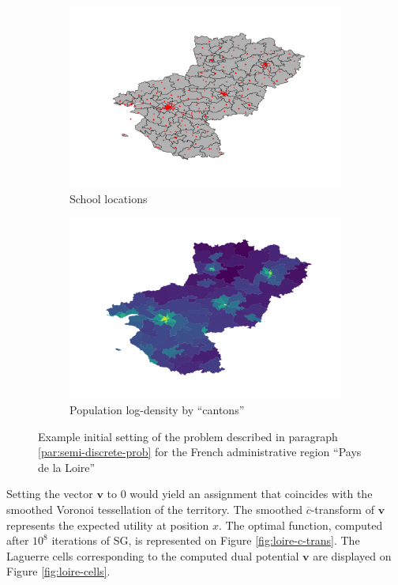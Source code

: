 \begin{figure}[h]
    \centering
    \begin{subfigure}{.49\linewidth}
        \centering
        \includegraphics[width=\linewidth]{figures/nantes.pdf}
        \caption{School locations}
    \end{subfigure}
    \begin{subfigure}{.49\linewidth}
        \centering
        \includegraphics[width=\linewidth]{figures/nantes_log_density.pdf}
        \caption{Population log-density by ``cantons''}
    \end{subfigure}
    \caption{Example initial setting of the problem described in paragraph \ref{par:semi-discrete-prob} for the French administrative region ``Pays de la Loire''}
    \label{fig:loire}
\end{figure}

Setting the vector $\bm{v}$ to 0 would yield an assignment that coincides with the smoothed Voronoi tessellation of the territory. The smoothed $\overline{c}$-transform of $\bm{v}$ represents the expected utility at position $x$. The optimal function, computed after $10^8$ iterations of SG, is represented on Figure \ref{fig:loire-c-trans}. The Laguerre cells corresponding to the computed dual potential $\bm{v}$ are displayed on Figure \ref{fig:loire-cells}.

